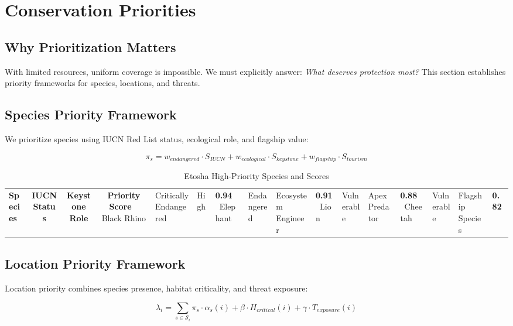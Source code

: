 \section{Conservation Priorities}

\subsection{Why Prioritization Matters}

With limited resources, uniform coverage is impossible. We must explicitly answer: \textit{What deserves protection most?} This section establishes priority frameworks for species, locations, and threats.

\subsection{Species Priority Framework}

We prioritize species using IUCN Red List status, ecological role, and flagship value:

\begin{equation}
\pi_s = w_{endangered} \cdot S_{IUCN} + w_{ecological} \cdot S_{keystone} + w_{flagship} \cdot S_{tourism}
\label{eq:species_priority}
\end{equation}

\begin{table}[H]
\centering
\caption{Etosha High-Priority Species and Scores}
\begin{tabular}{lccc}
\toprule
\textbf{Species} & \textbf{IUCN Status} & \textbf{Keystone Role} & \textbf{Priority Score} \
\midrule
Black Rhino & Critically Endangered & High & \textbf{0.94} \
Elephant & Endangered & Ecosystem Engineer & \textbf{0.91} \
Lion & Vulnerable & Apex Predator & \textbf{0.88} \
Cheetah & Vulnerable & Flagship Species & \textbf{0.82} \
\bottomrule
\end{tabular}
\end{table}

\subsection{Location Priority Framework}

Location priority combines species presence, habitat criticality, and threat exposure:

\begin{equation}
\lambda_i = \sum_{s \in \mathcal{S}_i} \pi_s \cdot \alpha_s(i) + \beta \cdot H_{critical}(i) + \gamma \cdot T_{exposure}(i)
\label{eq:location_priority}
\end{equation}

